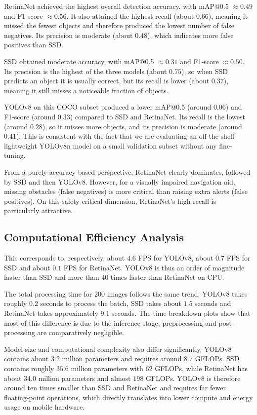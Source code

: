 \documentclass{FastFyp}
\begin{document}
RetinaNet achieved the highest overall detection accuracy, with mAP@0.5 $\approx 0.49$ and F1-score $\approx 0.56$. It also attained the highest recall (about $0.66$), meaning it missed the fewest objects and therefore produced the lowest number of false negatives. Its precision is moderate (about $0.48$), which indicates more false positives than SSD.

SSD obtained moderate accuracy, with mAP@0.5 $\approx 0.31$ and F1-score $\approx 0.50$. Its precision is the highest of the three models (about $0.75$), so when SSD predicts an object it is usually correct, but its recall is lower (about $0.37$), meaning it still misses a noticeable fraction of objects.

YOLOv8 on this COCO subset produced a lower mAP@0.5 (around $0.06$) and F1-score (around $0.33$) compared to SSD and RetinaNet. Its recall is the lowest (around $0.28$), so it misses more objects, and its precision is moderate (around $0.41$). This is consistent with the fact that we are evaluating an off-the-shelf lightweight YOLOv8n model on a small validation subset without any fine-tuning.

From a purely accuracy-based perspective, RetinaNet clearly dominates, followed by SSD and then YOLOv8. However, for a visually impaired navigation aid, missing obstacles (false negatives) is more critical than raising extra alerts (false positives). On this safety-critical dimension, RetinaNet's high recall is particularly attractive.

\subsection{Computational Efficiency Analysis}

This corresponds to, respectively, about $4.6$ FPS for YOLOv8, about $0.7$ FPS for SSD and about $0.1$ FPS for RetinaNet. YOLOv8 is thus an order of magnitude faster than SSD and more than $40$ times faster than RetinaNet on CPU.

The total processing time for 200 images follows the same trend: YOLOv8 takes roughly $0.2$ seconds to process the batch, SSD takes about $1.5$ seconds and RetinaNet takes approximately $9.1$ seconds. The time-breakdown plots show that most of this difference is due to the inference stage; preprocessing and post-processing are comparatively negligible.

Model size and computational complexity also differ significantly. YOLOv8 contains about $3.2$ million parameters and requires around $8.7$ GFLOPs. SSD contains roughly $35.6$ million parameters with $62$ GFLOPs, while RetinaNet has about $34.0$ million parameters and almost $198$ GFLOPs. YOLOv8 is therefore around ten times smaller than SSD and RetinaNet and requires far fewer floating-point operations, which directly translates into lower compute and energy usage on mobile hardware.
\end{document}
